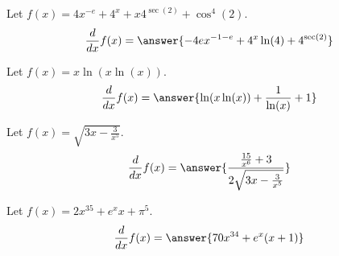 \documentclass{ximera}
\begin{document}
\begin{shuffle}
\begin{exercise}
Let $f(x)=4 x^{-e}+4^x+x 4^{\sec (2)}+\cos ^4(2)$.
\[
\ddx f(x) = \answer{-4 e x^{-1-e}+4^x \ln (4)+4^{\sec (2)}}
\]
\end{exercise}



\begin{exercise}
Let $f(x)=x \ln (x \ln (x))$.
\[
\ddx f(x) = \answer{\ln (x \ln (x))+\frac{1}{\ln (x)}+1}
\]
\end{exercise}

\begin{exercise}
Let $f(x)=\sqrt{3 x-\frac{3}{x^5}}$.
\[
\ddx f(x) = \answer{\frac{\frac{15}{x^6}+3}{2 \sqrt{3 x-\frac{3}{x^5}}}}
\]
\end{exercise}

\begin{exercise}
Let $f(x)=2 x^{35}+e^x x+\pi ^5$.
\[
\ddx f(x) = \answer{70 x^{34}+e^x (x+1)}
\]
\end{exercise}





\end{shuffle}
\end{document}

